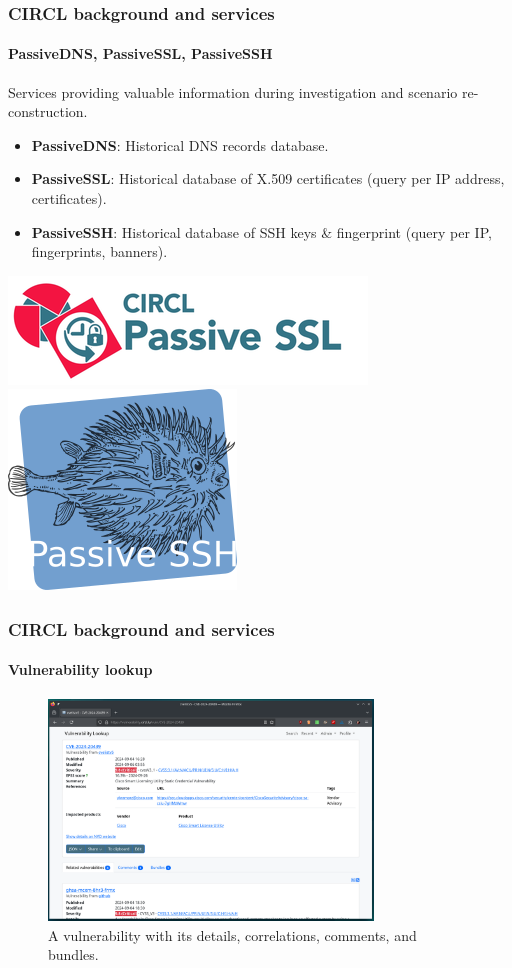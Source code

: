 \begin{frame}
\frametitle{CIRCL background and services}
\framesubtitle{PassiveDNS, PassiveSSL, PassiveSSH}
    Services providing valuable information during investigation and scenario re-construction.
    \begin{itemize}
        \item \textbf{PassiveDNS}: Historical DNS records database.
        \item \textbf{PassiveSSL}: Historical database of X.509 certificates (query per IP address, certificates).
        \item \textbf{PassiveSSH}: Historical database of SSH keys \& fingerprint (query per IP, fingerprints, banners). 
    \end{itemize}
    \begin{center}
        \includegraphics[width=0.4\linewidth]{pictures/pssl-logo.png}
        \includegraphics[width=0.2\linewidth]{pictures/pssh-logo.png}
    \end{center}
\end{frame}



\begin{frame}
 \frametitle{CIRCL background and services}
  \framesubtitle{Vulnerability lookup}
    \begin{figure}[H]
        \centering
        \includegraphics[width=0.77\textwidth]{vulnerability.png}
        \caption{A vulnerability with its details, correlations, comments, and bundles.}
        \label{fig:vulnerability}
    \end{figure}
\end{frame}


